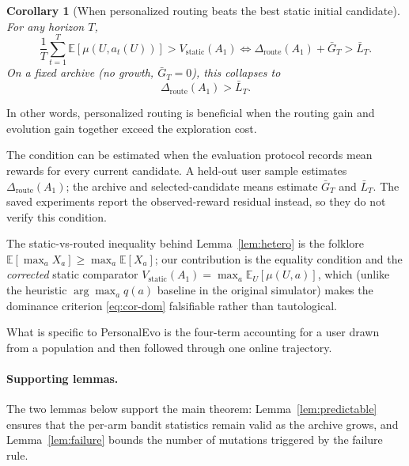 \documentclass{article} %
\newtheorem{corollary}[theorem]{Corollary}
\providecommand{\E}{\mathbb{E}}
\begin{document}
\label{sec:method-cor-dom}

\begin{corollary}[When personalized routing beats the best static initial candidate]
\label{cor:dominance}
For any horizon $T$,
\begin{equation}
\label{eq:cor-dom}
\frac{1}{T}\sum_{t=1}^T \E[\mu(U, a_t(U))] > V_{\mathrm{static}}(A_1)
\iff
\Delta_{\mathrm{route}}(A_1) + \bar G_T > \bar L_T.
\end{equation}
On a fixed archive (no growth, $\bar G_T = 0$), this collapses to
\begin{equation}
\label{eq:cor-dom-fixed}
\Delta_{\mathrm{route}}(A_1) > \bar L_T.
\end{equation}
\end{corollary}

In other words, personalized routing is beneficial when the routing gain and evolution gain together exceed the exploration cost.

The condition can be estimated when the evaluation protocol records mean
rewards for every current candidate. A held-out user sample estimates
\(\Delta_{\mathrm{route}}(A_1)\); the archive and selected-candidate means
estimate \(\bar G_T\) and \(\bar L_T\). The saved experiments report the
observed-reward residual instead, so they do not verify this condition.

The static-vs-routed inequality behind Lemma~\ref{lem:hetero} is the folklore $\E[\max_a X_a]\ge\max_a\E[X_a]$; our contribution is the equality condition and the \emph{corrected} static comparator $V_{\mathrm{static}}(A_1)=\max_a\E_U[\mu(U,a)]$, which (unlike the heuristic $\arg\max_a q(a)$ baseline in the original simulator) makes the dominance criterion \eqref{eq:cor-dom} falsifiable rather than tautological.

What is specific to PersonalEvo is the four-term accounting for a user drawn
from a population and then followed through one online trajectory.

\paragraph{Supporting lemmas.}

\label{sec:method-supporting}

The two lemmas below support the main theorem: Lemma~\ref{lem:predictable} ensures that the per-arm bandit statistics remain valid as the archive grows, and Lemma~\ref{lem:failure} bounds the number of mutations triggered by the failure rule.
\end{document}
